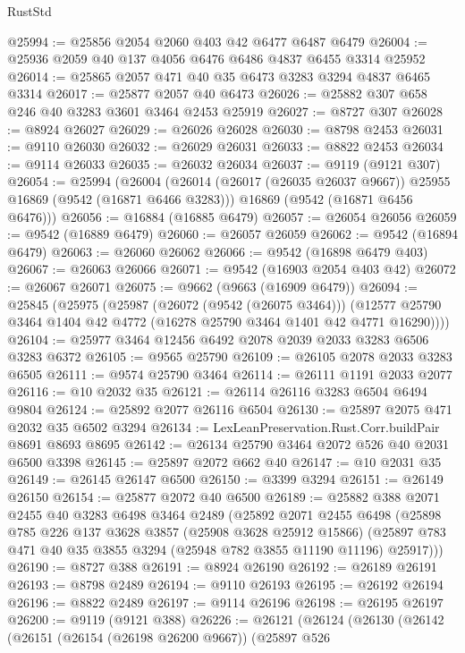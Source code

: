 \begin{lexlean}{RustStd}
\begin{coremodule}
@25994 := @25856 @2054 @2060 @403 @42 @6477 @6487 @6479
@26004 := @25936 @2059 @40 @137 @4056 @6476 @6486 @4837 @6455 @3314 @25952
@26014 := @25865 @2057 @471 @40 @35 @6473 @3283 @3294 @4837 @6465 @3314
@26017 := @25877 @2057 @40 @6473
@26026 := @25882 @307 @658 @246 @40 @3283 @3601 @3464 @2453 @25919
@26027 := @8727 @307
@26028 := @8924 @26027
@26029 := @26026 @26028
@26030 := @8798 @2453
@26031 := @9110 @26030
@26032 := @26029 @26031
@26033 := @8822 @2453
@26034 := @9114 @26033
@26035 := @26032 @26034
@26037 := @9119 (@9121 @307)
@26054 := @25994
    (@26004
      (@26014 (@26017 (@26035 @26037 @9667)) @25955 @16869 (@9542 (@16871 @6466 @3283)))
      @16869
      (@9542 (@16871 @6456 @6476)))
@26056 := @16884 (@16885 @6479)
@26057 := @26054 @26056
@26059 := @9542 (@16889 @6479)
@26060 := @26057 @26059
@26062 := @9542 (@16894 @6479)
@26063 := @26060 @26062
@26066 := @9542 (@16898 @6479 @403)
@26067 := @26063 @26066
@26071 := @9542 (@16903 @2054 @403 @42)
@26072 := @26067 @26071
@26075 := @9662 (@9663 (@16909 @6479))
@26094 := @25845
    (@25975
      (@25987
        (@26072 (@9542 (@26075 @3464)))
        (@12577 @25790 @3464 @1404 @42 @4772 (@16278 @25790 @3464 @1401 @42 @4771 @16290))))
@26104 := @25977 @3464 @12456 @6492 @2078 @2039 @2033 @3283 @6506 @3283 @6372
@26105 := @9565 @25790
@26109 := @26105 @2078 @2033 @3283 @6505
@26111 := @9574 @25790 @3464
@26114 := @26111 @1191 @2033 @2077
@26116 := @10 @2032 @35
@26121 := @26114 @26116 @3283 @6504 @6494 @9804
@26124 := @25892 @2077 @26116 @6504
@26130 := @25897 @2075 @471 @2032 @35 @6502 @3294
@26134 := LexLeanPreservation.Rust.Corr.buildPair @8691 @8693 @8695
@26142 := @26134 @25790 @3464 @2072 @526 @40 @2031 @6500 @3398
@26145 := @25897 @2072 @662 @40
@26147 := @10 @2031 @35
@26149 := @26145 @26147 @6500
@26150 := @3399 @3294
@26151 := @26149 @26150
@26154 := @25877 @2072 @40 @6500
@26189 := @25882
    @388
    @2071
    @2455
    @40
    @3283
    @6498
    @3464
    @2489
    (@25892
      @2071
      @2455
      @6498
      (@25898
        @785
        @226
        @137
        @3628
        @3857
        (@25908 @3628 @25912 @15866)
        (@25897 @783 @471 @40 @35 @3855 @3294 (@25948 @782 @3855 @11190 @11196) @25917)))
@26190 := @8727 @388
@26191 := @8924 @26190
@26192 := @26189 @26191
@26193 := @8798 @2489
@26194 := @9110 @26193
@26195 := @26192 @26194
@26196 := @8822 @2489
@26197 := @9114 @26196
@26198 := @26195 @26197
@26200 := @9119 (@9121 @388)
@26226 := @26121
    (@26124
      (@26130
        (@26142
          (@26151
            (@26154 (@26198 @26200 @9667))
            (@25897
              @526

\end{coremodule}
\end{lexlean}
